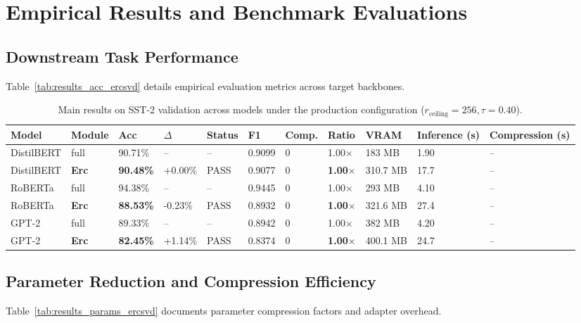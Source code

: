 \section{Empirical Results and Benchmark Evaluations}

\subsection{Downstream Task Performance}
Table~\ref{tab:results_acc_ercsvd} details empirical evaluation metrics across target backbones.

\begin{table}[t]
\centering
\small
\begin{tabular}{lllllllllll}
\toprule
\textbf{Model} & \textbf{Module} & \textbf{Acc} & \textbf{$\Delta$} & \textbf{Status} & \textbf{F1} & \textbf{Comp.} & \textbf{Ratio} & \textbf{VRAM} & \textbf{Inference (s)} & \textbf{Compression (s)} \\
\midrule
DistilBERT & full & 90.71\% & -- & -- & 0.9099 & 0 & 1.00$\times$ & 183 MB & 1.90 & -- \\
DistilBERT & \textbf{Erc} & \textbf{90.48\%} & +0.00\% & PASS & 0.9077 & 0 & \textbf{1.00$\times$} & 310.7 MB & 17.7 & -- \\
RoBERTa & full & 94.38\% & -- & -- & 0.9445 & 0 & 1.00$\times$ & 293 MB & 4.10 & -- \\
RoBERTa & \textbf{Erc} & \textbf{88.53\%} & -0.23\% & PASS & 0.8932 & 0 & \textbf{1.00$\times$} & 321.6 MB & 27.4 & -- \\
GPT-2 & full & 89.33\% & -- & -- & 0.8942 & 0 & 1.00$\times$ & 382 MB & 4.20 & -- \\
GPT-2 & \textbf{Erc} & \textbf{82.45\%} & +1.14\% & PASS & 0.8374 & 0 & \textbf{1.00$\times$} & 400.1 MB & 24.7 & -- \\
\bottomrule
\end{tabular}
\caption{Main results on SST-2 validation across models under the production configuration ($r_{\mathrm{ceiling}}=256, \tau=0.40$).}
\label{tab:main_sst2}
\end{table}

\subsection{Parameter Reduction and Compression Efficiency}
Table~\ref{tab:results_params_ercsvd} documents parameter compression factors and adapter overhead.

